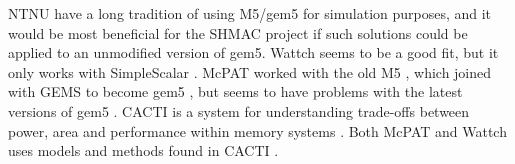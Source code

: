 NTNU have a long tradition of using M5/gem5 for simulation purposes, and it
would be most beneficial for the SHMAC project if such solutions could be
applied to an unmodified version of gem5. Wattch seems to be a good fit, but it
only works with SimpleScalar \cite{wattchanalysis}. McPAT worked with the old M5
\cite{m5mcpatparser}, which joined with GEMS to become gem5 \cite{gem5hipeac},
but seems to have problems with the latest versions of gem5
\cite{mcpatgem5problems}. CACTI is a system for understanding trade-offs between
power, area and performance within memory systems
\cite{hpcacti,muralimanohar2010memory}. Both McPAT and Wattch uses models and
methods found in CACTI \cite{li2009mcpat}.




